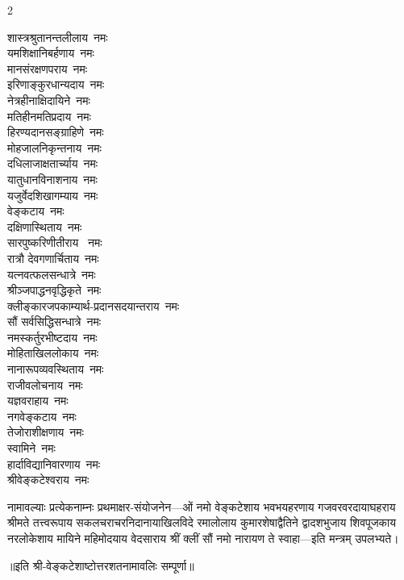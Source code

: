 \begin{multicols}{2}
\begin{flushleft}
शास्त्रश्रुतानन्तलीलाय~नमः\\
यमशिक्षानिबर्हणाय~नमः\\
मानसंरक्षणपराय~नमः\\
इरिणाङ्कुरधान्यदाय~नमः\\
नेत्रहीनाक्षिदायिने~नमः\\
मतिहीनमतिप्रदाय~नमः\\
हिरण्यदानसङ्ग्राहिणे~नमः\\
मोहजालनिकृन्तनाय~नमः\\
दधिलाजाक्षतार्च्याय~नमः\\
यातुधानविनाशनाय~नमः\hfill{}\\
                                                        
यजुर्वेदशिखागम्याय~नमः\\
वेङ्कटाय~नमः\\
दक्षिणास्थिताय~नमः\\
सारपुष्करिणीतीराय ~नमः\\
रात्रौ  देवगणार्चिताय~नमः\\
यत्नवत्फलसन्धात्रे~नमः\\
श्रीञ्जपाद्धनवृद्धिकृते~नमः\\
क्लीङ्कारजपकाम्यार्थ-प्रदानसदयान्तराय~नमः\\
सौं सर्वसिद्धिसन्धात्रे~नमः\\
नमस्कर्तुरभीष्टदाय~नमः\hfill{}\\
        
मोहिताखिललोकाय~नमः\\
नानारूपव्यवस्थिताय~नमः\\
राजीवलोचनाय~नमः\\
यज्ञवराहाय~नमः\\
नगवेङ्कटाय~नमः\\ %
तेजोराशीक्षणाय~नमः\\
स्वामिने~नमः\\
हार्दाविद्यानिवारणाय~नमः\hfill{}\\
श्रीवेङ्कटेश्वराय~नमः\\
    \end{flushleft}
\end{multicols}

नामावल्याः प्रत्येकनाम्नः प्रथमाक्षर-संयोजनेन---ओं नमो वेङ्कटेशाय
भवभयहरणाय
गजवरवरदायाघहराय
श्रीमते तत्त्वरूपाय
सकलचराचरनिदानायाखिलविदे
रमालोलाय
कुमारशेषाद्वैतिने
द्वादशभुजाय
शिवपूजकाय
नरलोकेशाय
मायिने
महिमोदयाय
वेदसाराय
श्रीं क्लीं सौं
नमो नारायण ते स्वाहा---इति मन्त्रम् उपलभ्यते।

॥इति श्री-वेङ्कटेशाष्टोत्तरशतनामावलिः सम्पूर्णा॥
